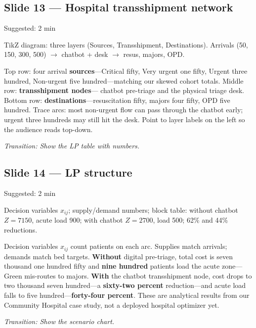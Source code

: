 \documentclass[11pt]{article}
\newcommand{\transition}[1]{\medskip\noindent\textit{\textcolor{knustMuted}{Transition: #1}}\medskip}
\newcommand{\deck}[1]{{\small\texttt{\textcolor{knustMuted}{main.pdf slide: #1}}}}
\newcommand{\slide}[3]{%
  \subsection{Slide #1 --- #2}%
  \noindent\deck{#1 --- #3}\par\smallskip}
\begin{document}
\slide{13}{Hospital transshipment network}{Transshipment}
\begin{timing}Suggested: 2 min\end{timing}
\begin{onscreen}
TikZ diagram: three layers (Sources, Transshipment, Destinations). Arrivals (50, 150, 300, 500) $\to$
chatbot + desk $\to$ resus, majors, OPD.
\end{onscreen}
\begin{saybox}
Top row: four arrival \textbf{sources}---Critical fifty, Very urgent one fifty, Urgent three hundred,
Non-urgent five hundred---matching our skewed cohort totals. Middle row: \textbf{transshipment nodes}---
chatbot pre-triage and the physical triage desk. Bottom row: \textbf{destinations}---resuscitation fifty,
majors four fifty, OPD five hundred. Trace arcs: most non-urgent flow can pass through the chatbot early;
urgent three hundreds may still hit the desk. Point to layer labels on the left so the audience reads
top-down.
\end{saybox}
\transition{Show the LP table with numbers.}

\slide{14}{LP structure}{Transshipment}
\begin{timing}Suggested: 2 min\end{timing}
\begin{onscreen}
Decision variables $x_{ij}$; supply/demand numbers; block table: without chatbot $Z=7150$, acute load 900;
with chatbot $Z=2700$, load 500; 62\% and 44\% reductions.
\end{onscreen}
\begin{saybox}
Decision variables $x_{ij}$ count patients on each arc. Supplies match arrivals; demands match bed
targets. \textbf{Without} digital pre-triage, total cost is seven thousand one hundred fifty and
\textbf{nine hundred} patients load the acute zone---Green mis-routes to majors. \textbf{With} the
chatbot transshipment node, cost drops to two thousand seven hundred---a \textbf{sixty-two percent}
reduction---and acute load falls to five hundred---\textbf{forty-four percent}. These are analytical
results from our Community Hospital case study, not a deployed hospital optimizer yet.
\end{saybox}
\transition{Show the scenario chart.}
\end{document}
